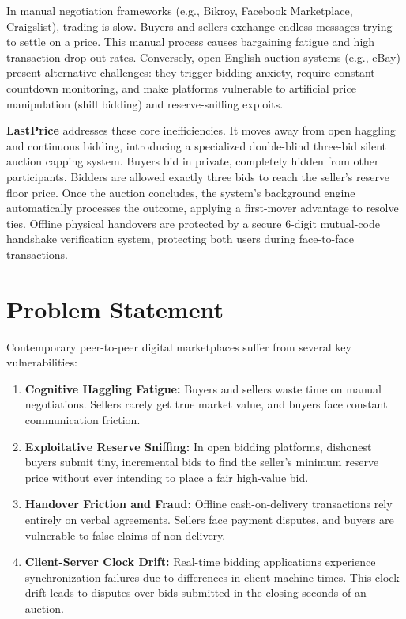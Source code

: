 \documentclass[12pt,a4paper,oneside]{report}
\begin{document}
In manual negotiation frameworks (e.g., Bikroy, Facebook Marketplace, Craigslist), trading is slow. Buyers and sellers exchange endless messages trying to settle on a price. This manual process causes bargaining fatigue and high transaction drop-out rates. Conversely, open English auction systems (e.g., eBay) present alternative challenges: they trigger bidding anxiety, require constant countdown monitoring, and make platforms vulnerable to artificial price manipulation (shill bidding) and reserve-sniffing exploits.

\textbf{LastPrice} addresses these core inefficiencies. It moves away from open haggling and continuous bidding, introducing a specialized double-blind three-bid silent auction capping system. Buyers bid in private, completely hidden from other participants. Bidders are allowed exactly three bids to reach the seller's reserve floor price. Once the auction concludes, the system's background engine automatically processes the outcome, applying a first-mover advantage to resolve ties. Offline physical handovers are protected by a secure 6-digit mutual-code handshake verification system, protecting both users during face-to-face transactions.

\section{Problem Statement}
Contemporary peer-to-peer digital marketplaces suffer from several key vulnerabilities:
\begin{enumerate}
    \item \textbf{Cognitive Haggling Fatigue:} Buyers and sellers waste time on manual negotiations. Sellers rarely get true market value, and buyers face constant communication friction.
    \item \textbf{Exploitative Reserve Sniffing:} In open bidding platforms, dishonest buyers submit tiny, incremental bids to find the seller's minimum reserve price without ever intending to place a fair high-value bid.
    \item \textbf{Handover Friction and Fraud:} Offline cash-on-delivery transactions rely entirely on verbal agreements. Sellers face payment disputes, and buyers are vulnerable to false claims of non-delivery.
    \item \textbf{Client-Server Clock Drift:} Real-time bidding applications experience synchronization failures due to differences in client machine times. This clock drift leads to disputes over bids submitted in the closing seconds of an auction.
\end{enumerate}
\end{document}
